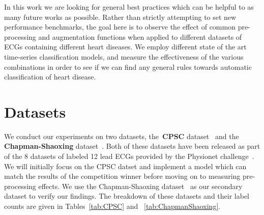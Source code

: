 \documentclass{article}
\begin{document}
In this work we are looking for general best practices which can be helpful to as many future works as possible. Rather than strictly attempting to set new performance benchmarks, the goal here is to observe the effect of common pre-processing and augmentation functions when applied to different datasets of ECGs containing different heart diseases. We employ different state of the art time-series classification models, and measure the effectiveness of the various combinations in order to see if we can find any general rules towards automatic classification of heart disease.



\section{Datasets}
\label{datasets}
We conduct our experiments on two datasets, the~\textbf{CPSC} dataset~\cite{liu2018open} and the \textbf{Chapman-Shaoxing} dataset~\cite{zheng202012}. Both of these datasets have been released as part of the 8 datasets of labeled 12 lead ECGs provided by the Physionet challenge~\cite{reyna2021will,reyna4issues}. We will initially focus on the CPSC datset and implement a model which can match the results of the competition winner before moving on to measuring pre-processing effects. We use the Chapman-Shaoxing dataset~\cite{zheng202012} as our secondary dataset to verify our findings. The breakdown of these datasets and their label counts are given in Tables~\ref{tab:CPSC} and ~\ref{tab:ChapmanShaoxing}.
\end{document}
